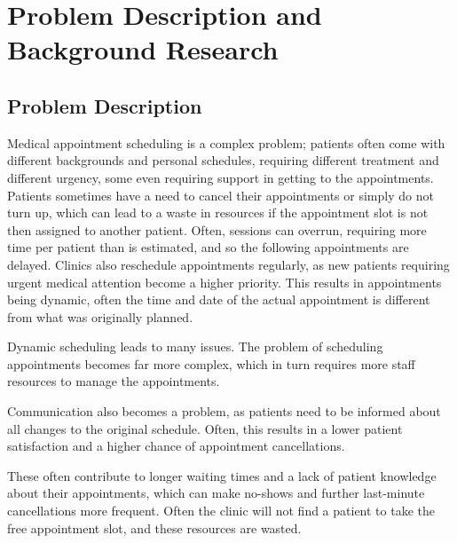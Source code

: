 
\chapter{Problem Description and Background Research} %

\label{Chapter2} %



\section{Problem Description}

Medical appointment scheduling is a complex problem; patients often come with different backgrounds and personal schedules, requiring different treatment and different urgency, some even requiring support in getting to the appointments. Patients sometimes have a need to cancel their appointments or simply do not turn up, which can lead to a waste in resources if the appointment slot is not then assigned to another patient. Often, sessions can overrun, requiring more time per patient than is estimated, and so the following appointments are delayed. Clinics also reschedule appointments regularly, as new patients requiring urgent medical attention become a higher priority. This results in appointments being dynamic, often the time and date of the actual appointment is different from what was originally planned.

Dynamic scheduling leads to many issues. The problem of scheduling appointments becomes far more complex, which in turn requires more staff resources to manage the appointments.

Communication also becomes a problem, as patients need to be informed about all changes to the original schedule. Often, this results in a lower patient satisfaction and a higher chance of appointment cancellations.

These often contribute to longer waiting times and a lack of patient knowledge about their appointments, which can make no-shows and further last-minute cancellations more frequent. Often the clinic will not find a patient to take the free appointment slot, and these resources are wasted.

